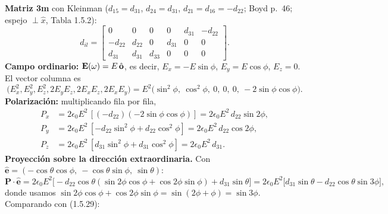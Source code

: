 \textbf{Matriz 3m} con Kleinman ($d_{15}=d_{31}$, $d_{24}=d_{31}$, $d_{21}=d_{16}=-d_{22}$; Boyd p.~46; espejo $\perp\hat x$, Tabla 1.5.2):
\[
d_{il}=\begin{bmatrix}0&0&0&0&d_{31}&-d_{22}\\-d_{22}&d_{22}&0&d_{31}&0&0\\d_{31}&d_{31}&d_{33}&0&0&0\end{bmatrix}.
\]
\textbf{Campo ordinario:} $\mathbf E(\omega)=E\,\hat{\mathbf o}$, es decir, $E_x=-E\sin\phi$, $E_y=E\cos\phi$, $E_z=0$. El vector columna es
\[
\big(E_x^2,E_y^2,E_z^2,2E_yE_z,2E_xE_z,2E_xE_y\big)=E^2\big(\sin^2\phi,\ \cos^2\phi,\ 0,\ 0,\ 0,\ -2\sin\phi\cos\phi\big).
\]
\textbf{Polarización:} multiplicando fila por fila,
\begin{align*}
P_x&=2\epsilon_0E^2\,[(-d_{22})(-2\sin\phi\cos\phi)]=2\epsilon_0E^2\,d_{22}\sin2\phi,\\
P_y&=2\epsilon_0E^2\,[-d_{22}\sin^2\phi+d_{22}\cos^2\phi]=2\epsilon_0E^2\,d_{22}\cos2\phi,\\
P_z&=2\epsilon_0E^2\,[d_{31}\sin^2\phi+d_{31}\cos^2\phi]=2\epsilon_0E^2\,d_{31}.
\end{align*}
\textbf{Proyección sobre la dirección extraordinaria.} Con $\hat{\mathbf e}=(-\cos\theta\cos\phi,\ -\cos\theta\sin\phi,\ \sin\theta)$:
\[
\mathbf P\cdot\hat{\mathbf e}=2\epsilon_0E^2\big[-d_{22}\cos\theta(\sin2\phi\cos\phi+\cos2\phi\sin\phi)+d_{31}\sin\theta\big]
=2\epsilon_0E^2\big[d_{31}\sin\theta-d_{22}\cos\theta\sin3\phi\big],
\]
donde usamos $\sin2\phi\cos\phi+\cos2\phi\sin\phi=\sin(2\phi+\phi)=\sin3\phi$. Comparando con (1.5.29):

